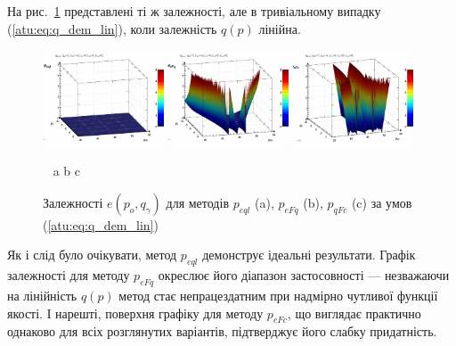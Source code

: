 На рис.~\ref{atu:f:qsl_pe_po_qg_lin} представлені ті ж залежності, але в
тривіальному випадку (\ref{atu:eq:q_dem_lin}), коли залежність
$q(p)$ лінійна.

\begin{figure}[htb!]
  \begin{center}
    \includegraphics[width=0.32\textwidth]{p/qls_pe-p_po_qg_eql_lin.png}
    \hfill
    \includegraphics[width=0.32\textwidth]{p/qls_pe-p_po_qg_eFq_lin.png}
    \hfill
    \includegraphics[width=0.32\textwidth]{p/qls_pe-p_po_qg_eFc_lin.png}
  \end{center}
  \vspace{-1.0ex}
  \begin{center}
    ~ \hfill a \hfill\hfill b \hfill\hfill c \hfill ~
  \end{center}
  \vspace{-1.5ex}
  \caption{Залежності $e(p_o,q_\gamma)$ для методів $p_{eql}$ (a), $p_{eFq}$ (b), $p_{qFc}$ (c) за умов (\ref{atu:eq:q_dem_lin})}
  \label{atu:f:qsl_pe_po_qg_lin}
\end{figure}

Як і слід було очікувати, метод
$p_{eql}$ демонструє ідеальні результати. Графік залежності для
методу
$p_{eFq}$ окреслює його діапазон застосовності --- незважаючи на
лінійність
$q(p)$ метод стає непрацездатним при надмірно чутливої
функції якості. І нарешті, поверхня графіку для методу
$p_{eFc}$, що виглядає практично однаково для всіх розглянутих варіантів,
підтверджує його слабку придатність.


